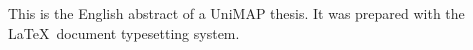 \begin{EnAbstract}  
	\begin{singlespace}\noindent
		This is the English abstract of a UniMAP thesis.  It was prepared with the \LaTeX\ document typesetting system.		
	\end{singlespace}
\end{EnAbstract}